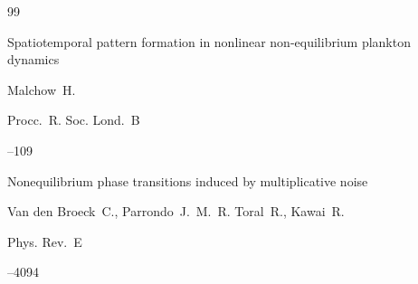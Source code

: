 \begin{thebibliography}{99}

\paper Spatiotemporal pattern formation in nonlinear non-equilibrium plankton dynamics

\by Malchow~H.

\jour  Procc.~R. Soc. Lond.~B




--109




\paper Nonequilibrium phase transitions induced by multiplicative noise

\by Van den Broeck~C., Parrondo~J.~M.~R. Toral~R., Kawai~R.

\jour  Phys. Rev.~E




--4094







\end{thebibliography}





\noindent

\hskip6.5cm \thedate \par\noindent

\hskip6.5cm\therevdate



\vspace{-5mm}




%




\makeengtitle





\newpage



%

